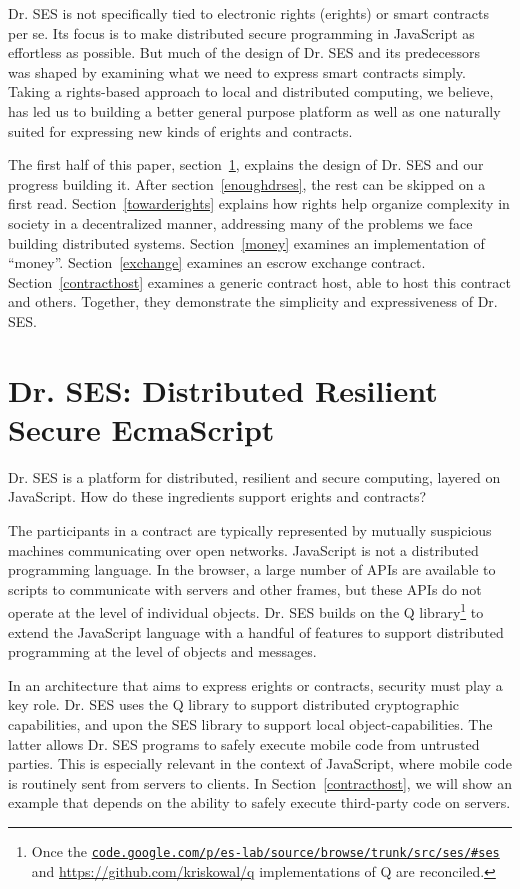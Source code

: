 \documentclass{llncs}
\newcommand{\myurl}[1]{{\href{http://#1}{\texttt{#1}}}}
\begin{document}
Dr. SES is not specifically tied to electronic rights (erights) or smart contracts per se. Its focus is to make distributed secure programming in JavaScript as effortless as possible. But much of the design of Dr. SES and its predecessors~\cite{tribble:joule,miller:ode,Close:Waterken} was shaped by examining what we need to express smart contracts simply. Taking a rights-based approach to local and distributed computing, we believe, has led us to building a better general purpose platform as well as one naturally suited for expressing new kinds of erights and contracts.

The first half of this paper, section~\ref{drses}, explains the design of Dr. SES and our progress building it.  After section~\ref{enoughdrses}, the rest can be skipped on a first read. Section~\ref{towarderights} explains how rights help organize complexity in society in a decentralized manner, addressing many of the problems we face building distributed systems. Section~\ref{money} examines an implementation of ``money''. Section~\ref{exchange} examines an escrow exchange contract. Section~\ref{contracthost} examines a generic contract host, able to host this contract and others. Together, they demonstrate the simplicity and expressiveness of Dr. SES.



\section{Dr. SES: Distributed Resilient Secure EcmaScript}
\label{drses}

Dr. SES is a platform for distributed, resilient and secure computing, layered on JavaScript. How do these ingredients support erights and contracts?

The participants in a contract are typically represented by mutually suspicious machines communicating over open networks. JavaScript is not a distributed programming language. In the browser, a large number of APIs are available to scripts to communicate with servers and other frames, but these APIs do not operate at the level of individual objects. Dr. SES builds on the Q library\footnote{
%
Once the \myurl{code.google.com/p/es-lab/source/browse/trunk/src/ses/\#ses} and \url{https://github.com/kriskowal/q} implementations of Q are reconciled.
%
} to extend the JavaScript language with a handful of features to support distributed programming at the level of objects and messages.

In an architecture that aims to express erights or contracts, security must play a key role. Dr. SES uses the Q library to support distributed cryptographic capabilities, and upon the SES library to support local object-capabilities. The latter allows Dr. SES programs to safely execute mobile code from untrusted parties.
This is especially relevant in the context of JavaScript, where mobile code is routinely sent from servers to clients. In Section~\ref{contracthost}, we will show an example that  depends on the ability to safely execute third-party code on servers.
\end{document}

